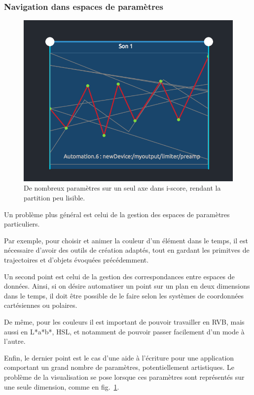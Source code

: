 \documentclass[french]{article}
\begin{document}
\subsubsection{Navigation dans espaces de paramètres}

\begin{figure}[h]
\centering
\includegraphics[scale=0.5]{images/iscore.png}
\caption{De nombreux paramètres sur un seul axe dans i-score, rendant la partition peu lisible.}
\label{fig.iscore}
\end{figure}

Un problème plus général est celui de la gestion des espaces de paramètres particuliers.

Par exemple, pour choisir et animer la couleur d'un élément dans le temps, il est nécessaire d'avoir des outils de création adaptés, tout en gardant les primitves de trajectoires et d'objets évoquées précédemment.

Un second point est celui de la gestion des correspondances entre espaces de données. Ainsi, si on désire automatiser un point sur un plan en deux dimensions dans le temps, il doit être possible de le faire selon les systèmes de coordonnées cartésiennes ou polaires.

De même, pour les couleurs il est important de pouvoir travailler en RVB, mais aussi en L*a*b*, HSL, et notamment de pouvoir passer facilement d'un mode à l'autre.

Enfin, le dernier point est le cas d'une aide à l'écriture pour une application comportant un grand nombre de paramètres, potentiellement artistiques. Le problème de la visualisation se pose lorsque ces paramètres sont représentés sur une seule dimension, comme en fig.~\ref{fig.iscore}.
\end{document}
